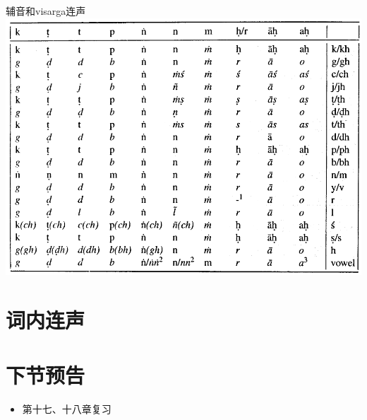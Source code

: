 \documentclass[17pt]{beamer}
\begin{document}
\begin{frame}{辅音和visarga连声}  
  \centering
  \includegraphics[width=\textwidth]{consonantsandhi.png} %
\end{frame}

\section{词内连声}





\section{下节预告}

\begin{frame}{\insertsection }
  \begin{itemize}
    \item
      第十七、十八章复习
    
  \end{itemize}
\end{frame}  
\end{document}
